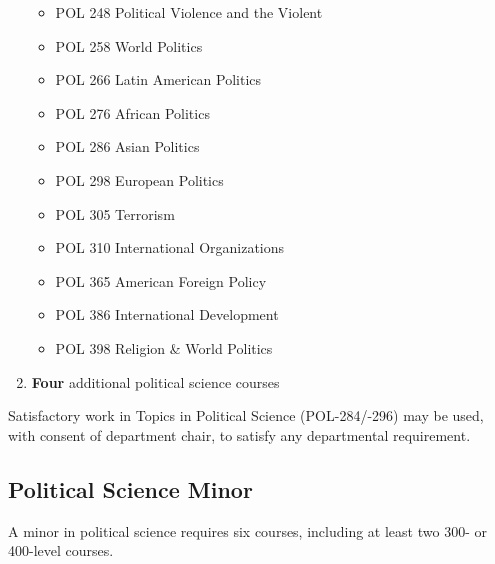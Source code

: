 \documentclass[
  letterpaper,
]{scrbook}
\providecommand{\tightlist}{%
  \setlength{\itemsep}{0pt}\setlength{\parskip}{0pt}}
\begin{document}
\begin{enumerate}
  \begin{itemize}
  \tightlist
  \item
    POL 248 Political Violence and the Violent
  \item
    POL 258 World Politics
  \item
    POL 266 Latin American Politics
  \item
    POL 276 African Politics
  \item
    POL 286 Asian Politics
  \item
    POL 298 European Politics
  \item
    POL 305 Terrorism
  \item
    POL 310 International Organizations\\
  \item
    POL 365 American Foreign Policy
  \item
    POL 386 International Development
  \item
    POL 398 Religion \& World Politics
  \end{itemize}
\item
  \textbf{Four} additional political science courses
\end{enumerate}

Satisfactory work in Topics in Political Science (POL-284/-296) may be
used, with consent of department chair, to satisfy any departmental
requirement.

\subsection{Political Science Minor}\label{political-science-minor}

A minor in political science requires six courses, including at least
two 300- or 400-level courses.
\end{document}
